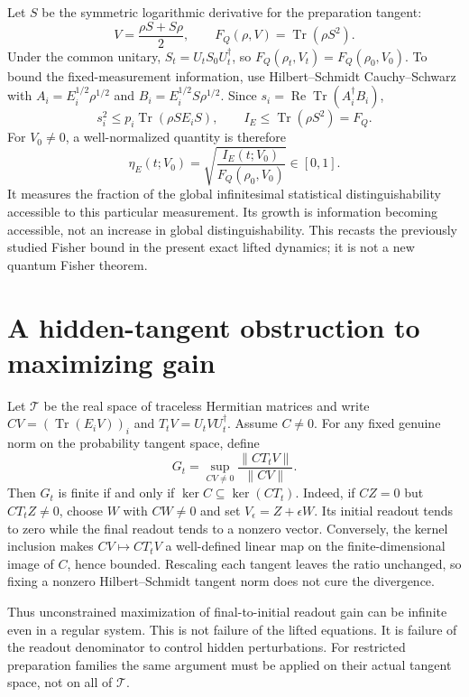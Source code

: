 \documentclass[11pt,a4paper]{article}
\newcommand{\Tr}{\operatorname{Tr}}
\begin{document}
Let $S$ be the symmetric logarithmic derivative for the preparation tangent:
\[V=\frac{\rho S+S\rho}{2},\qquad F_Q(\rho,V)=\Tr(\rho S^2).\]
Under the common unitary, $S_t=U_tS_0U_t^\dagger$, so $F_Q(\rho_t,V_t)=F_Q(\rho_0,V_0)$. To bound the fixed-measurement information, use Hilbert--Schmidt Cauchy--Schwarz with $A_i=E_i^{1/2}\rho^{1/2}$ and $B_i=E_i^{1/2}S\rho^{1/2}$. Since $s_i=\operatorname{Re}\Tr(A_i^\dagger B_i)$,
\[s_i^2\leq p_i\Tr(\rho S E_i S),\qquad I_E\leq\Tr(\rho S^2)=F_Q.\]
For $V_0\ne0$, a well-normalized quantity is therefore
\[\eta_E(t;V_0)=\sqrt{\frac{I_E(t;V_0)}{F_Q(\rho_0,V_0)}}\in[0,1].\]
It measures the fraction of the global infinitesimal statistical distinguishability accessible to this particular measurement. Its growth is information becoming accessible, not an increase in global distinguishability. This recasts the previously studied Fisher bound in the present exact lifted dynamics; it is not a new quantum Fisher theorem.
\section{A hidden-tangent obstruction to maximizing gain}
Let $\mathcal T$ be the real space of traceless Hermitian matrices and write $CV=(\Tr(E_iV))_i$ and $T_tV=U_tVU_t^\dagger$. Assume $C\ne0$. For any fixed genuine norm on the probability tangent space, define
\[G_t=\sup_{CV\ne0}\frac{\|CT_tV\|}{\|CV\|}.\]
Then $G_t$ is finite if and only if $\ker C\subseteq\ker(CT_t)$. Indeed, if $CZ=0$ but $CT_tZ\ne0$, choose $W$ with $CW\ne0$ and set $V_\epsilon=Z+\epsilon W$. Its initial readout tends to zero while the final readout tends to a nonzero vector. Conversely, the kernel inclusion makes $CV\mapsto CT_tV$ a well-defined linear map on the finite-dimensional image of $C$, hence bounded. Rescaling each tangent leaves the ratio unchanged, so fixing a nonzero Hilbert--Schmidt tangent norm does not cure the divergence.

Thus unconstrained maximization of final-to-initial readout gain can be infinite even in a regular system. This is not failure of the lifted equations. It is failure of the readout denominator to control hidden perturbations. For restricted preparation families the same argument must be applied on their actual tangent space, not on all of $\mathcal T$.
\end{document}

